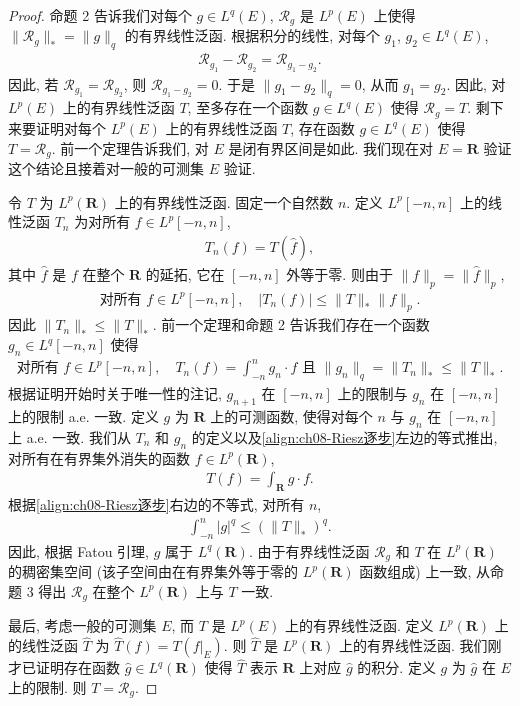 \documentclass[../../main.tex]{subfiles}
\begin{document}
\begin{proof}
命题 2 告诉我们对每个 $g\in L^{q}(E)$, $\mathcal{R}_{g}$ 是 $L^{p}(E)$ 上使得 $\|\mathcal{R}_{g}\|_{*}=\|g\|_{q}$ 的有界线性泛函. 根据积分的线性, 对每个 $g_{1}$, $g_{2}\in L^{q}(E)$,
\begin{align*}
\mathcal{R}_{g_{1}}-\mathcal{R}_{g_{2}}=\mathcal{R}_{g_{1}-g_{2}}.
\end{align*}
因此, 若 $\mathcal{R}_{g_{1}}=\mathcal{R}_{g_{2}}$, 则 $\mathcal{R}_{g_{1}-g_{2}}=0$. 于是 $\|g_{1}-g_{2}\|_{q}=0$, 从而 $g_{1}=g_{2}$. 因此, 对 $L^{p}(E)$ 上的有界线性泛函 $T$, 至多存在一个函数 $g\in L^{q}(E)$ 使得 $\mathcal{R}_{g}=T$. 剩下来要证明对每个 $L^{p}(E)$ 上的有界线性泛函 $T$, 存在函数 $g\in L^{q}(E)$ 使得 $T=\mathcal{R}_{g}$. 前一个定理告诉我们, 对 $E$ 是闭有界区间是如此. 我们现在对 $E=\mathbf{R}$ 验证这个结论且接着对一般的可测集 $E$ 验证.

令 $T$ 为 $L^{p}(\mathbf{R})$ 上的有界线性泛函. 固定一个自然数 $n$. 定义 $L^{p}[-n,n]$ 上的线性泛函 $T_{n}$ 为对所有 $f\in L^{p}[-n,n]$,
\begin{align*}
T_{n}(f)=T(\widehat{f}),
\end{align*}
其中 $\widehat{f}$ 是 $f$ 在整个 $\mathbf{R}$ 的延拓, 它在 $[-n,n]$ 外等于零. 则由于 $\|f\|_{p}=\|\widehat{f}\|_{p}$,
\begin{align*}
\text{对所有 }f\in L^{p}[-n,n],\quad|T_{n}(f)|\leqslant\|T\|_{*}\|f\|_{p}.
\end{align*}
因此 $\|T_{n}\|_{*}\leqslant\|T\|_{*}$. 前一个定理和命题 2 告诉我们存在一个函数 $g_{n}\in L^{q}[-n,n]$ 使得
\begin{align}
\text{对所有 }f\in L^{p}[-n,n],\quad T_{n}(f)=\int_{-n}^{n}g_{n}\cdot f\text{ 且 }\|g_{n}\|_{q}=\|T_{n}\|_{*}\leqslant\|T\|_{*}.\label{align:ch08-Riesz逐步}
\end{align}
根据证明开始时关于唯一性的注记, $g_{n+1}$ 在 $[-n,n]$ 上的限制与 $g_{n}$ 在 $[-n,n]$ 上的限制 a.e. 一致. 定义 $g$ 为 $\mathbf{R}$ 上的可测函数, 使得对每个 $n$ 与 $g_{n}$ 在 $[-n,n]$ 上 a.e. 一致. 我们从 $T_{n}$ 和 $g_{n}$ 的定义以及\eqref{align:ch08-Riesz逐步}左边的等式推出, 对所有在有界集外消失的函数 $f\in L^{p}(\mathbf{R})$,
\begin{align*}
T(f)=\int_{\mathbf{R}}g\cdot f.
\end{align*}
根据\eqref{align:ch08-Riesz逐步}右边的不等式, 对所有 $n$,
\begin{align*}
\int_{-n}^{n}|g|^{q}\leqslant(\|T\|_{*})^{q}.
\end{align*}
因此, 根据 Fatou 引理, $g$ 属于 $L^{q}(\mathbf{R})$. 由于有界线性泛函 $\mathcal{R}_{g}$ 和 $T$ 在 $L^{p}(\mathbf{R})$ 的稠密集空间 (该子空间由在有界集外等于零的 $L^{p}(\mathbf{R})$ 函数组成) 上一致, 从命题 3 得出 $\mathcal{R}_{g}$ 在整个 $L^{p}(\mathbf{R})$ 上与 $T$ 一致.

最后, 考虑一般的可测集 $E$, 而 $T$ 是 $L^{p}(E)$ 上的有界线性泛函. 定义 $L^{p}(\mathbf{R})$ 上的线性泛函 $\widehat{T}$ 为 $\widehat{T}(f)=T(f|_{E})$. 则 $\widehat{T}$ 是 $L^{p}(\mathbf{R})$ 上的有界线性泛函. 我们刚才已证明存在函数 $\widehat{g}\in L^{q}(\mathbf{R})$ 使得 $\widehat{T}$ 表示 $\mathbf{R}$ 上对应 $\widehat{g}$ 的积分. 定义 $g$ 为 $\widehat{g}$ 在 $E$ 上的限制. 则 $T=\mathcal{R}_{g}$.
\end{proof}
\end{document}
